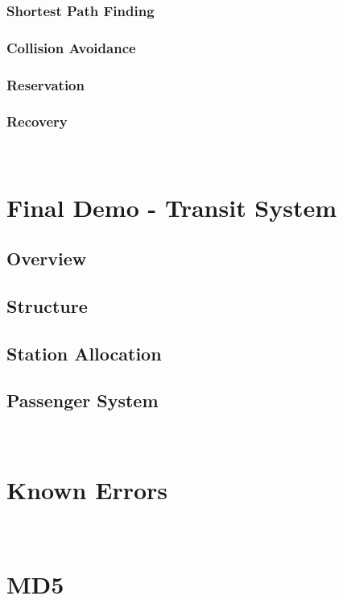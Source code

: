 \documentclass[12pt]{article}
\begin{document}
\subsubsection{Shortest Path Finding}
\subsubsection{Collision Avoidance}
\subsubsection{Reservation}
\subsubsection{Recovery}
\\[2\baselineskip]
\section{Final Demo - Transit System}
\subsection{Overview}
\subsection{Structure}
\subsection{Station Allocation}
\subsection{Passenger System}
\\[2\baselineskip]
\section{Known Errors}
\\[2\baselineskip]
\section{MD5}

\end{document}
